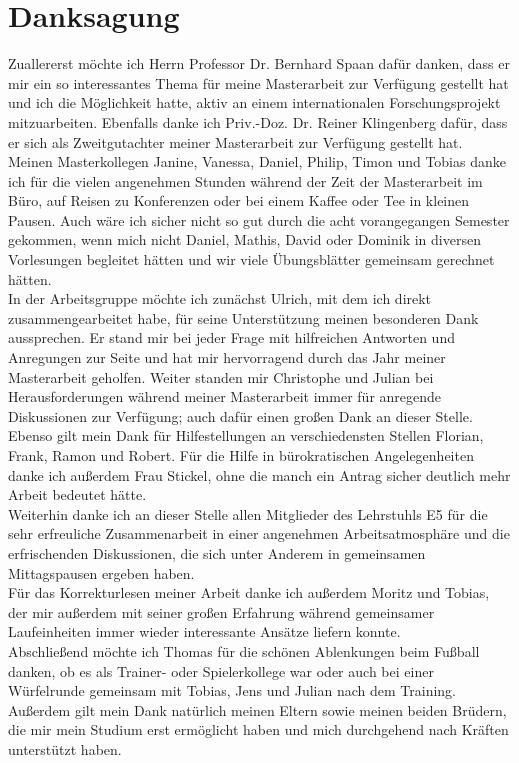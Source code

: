 \section*{Danksagung}

Zuallererst möchte ich Herrn Professor Dr. Bernhard Spaan dafür danken, dass er mir ein so interessantes Thema für meine Masterarbeit zur Verfügung gestellt hat und ich die Möglichkeit hatte, aktiv an einem internationalen Forschungsprojekt mitzuarbeiten. Ebenfalls danke ich Priv.-Doz. Dr. Reiner Klingenberg dafür, dass er sich als Zweitgutachter meiner Masterarbeit zur Verfügung gestellt hat.\\
Meinen Masterkollegen Janine, Vanessa, Daniel, Philip, Timon und Tobias danke ich für die vielen angenehmen Stunden während der Zeit der Masterarbeit im Büro, auf Reisen zu Konferenzen oder bei einem Kaffee oder Tee in kleinen Pausen. Auch wäre ich sicher nicht so gut durch die acht vorangegangen Semester gekommen, wenn mich nicht Daniel, Mathis, David oder Dominik in diversen Vorlesungen begleitet hätten und wir viele Übungsblätter gemeinsam gerechnet hätten.\\
In der Arbeitsgruppe möchte ich zunächst Ulrich, mit dem ich direkt zusammengearbeitet habe, für seine Unterstützung meinen besonderen Dank aussprechen. Er stand mir bei jeder Frage mit hilfreichen Antworten und Anregungen zur Seite und hat mir hervorragend durch das Jahr meiner Masterarbeit geholfen. Weiter standen mir Christophe und Julian bei Herausforderungen während meiner Masterarbeit immer für anregende Diskussionen zur Verfügung; auch dafür einen großen Dank an dieser Stelle. Ebenso gilt mein Dank für Hilfestellungen an verschiedensten Stellen Florian, Frank, Ramon und Robert. Für die Hilfe in bürokratischen Angelegenheiten danke ich außerdem Frau Stickel, ohne die manch ein Antrag sicher deutlich mehr Arbeit bedeutet hätte.\\
Weiterhin danke ich an dieser Stelle allen Mitglieder des Lehrstuhls E5 für die sehr erfreuliche Zusammenarbeit in einer angenehmen Arbeitsatmosphäre und die erfrischenden Diskussionen, die sich unter Anderem in gemeinsamen Mittagspausen ergeben haben. \\ 
Für das Korrekturlesen meiner Arbeit danke ich außerdem Moritz und Tobias, der mir außerdem mit seiner großen Erfahrung während gemeinsamer Laufeinheiten immer wieder interessante Ansätze liefern konnte.\\
Abschließend möchte ich Thomas für die schönen Ablenkungen beim Fußball danken, ob es als Trainer- oder Spielerkollege war oder auch bei einer Würfelrunde gemeinsam mit Tobias, Jens und Julian nach dem Training. Außerdem gilt mein Dank natürlich meinen Eltern sowie meinen beiden Brüdern, die mir mein Studium erst ermöglicht haben und mich durchgehend nach Kräften unterstützt haben.
